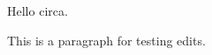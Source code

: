 \documentclass{article}
\begin{document}
Hello circa.

This is a paragraph for testing edits.
\end{document}
